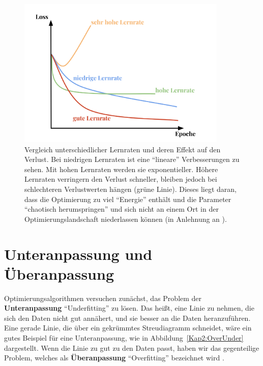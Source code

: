         \begin{figure}[H]
            \centering
            \includegraphics[width=10cm]{kapitel2/learnrate.png}
            \caption[Einfluss der Lernrate auf den Verlust]{Vergleich unterschiedlicher Lernraten und deren Effekt auf den Verlust. Bei niedrigen Lernraten ist eine \enquote{lineare} Verbesserungen zu sehen. Mit hohen Lernraten werden sie exponentieller. Höhere Lernraten verringern den Verlust schneller, bleiben jedoch bei schlechteren Verlustwerten hängen (grüne Linie). Dieses liegt daran, dass die Optimierung zu viel \enquote{Energie} enthält und die Parameter \enquote{chaotisch herumspringen} und sich nicht an einem Ort in der Optimierungslandschaft niederlassen können (in Anlehnung an \cite*{StanfordUniversityCoursecs231n2018}). }
            \label{Kap2:Lern}
        \end{figure}

        \section{Unteranpassung und Überanpassung}\label{overundersec}
        Optimierungsalgorithmen versuchen zunächst, das Problem der \textbf{Unteranpassung} \enquote{Underfitting} zu lösen. Das heißt, eine Linie zu nehmen, die sich den Daten nicht gut annähert, und sie besser an die Daten heranzuführen. Eine gerade Linie, die über ein gekrümmtes Streudiagramm schneidet, wäre ein gutes Beispiel für eine Unteranpassung, wie in Abbildung~\ref{Kap2:OverUnder} dargestellt. Wenn die Linie zu gut zu den Daten passt, haben wir das gegenteilige Problem, welches als \textbf{Überanpassung} \enquote{Overfitting} bezeichnet wird \cite*[27]{Patterson2019}.

